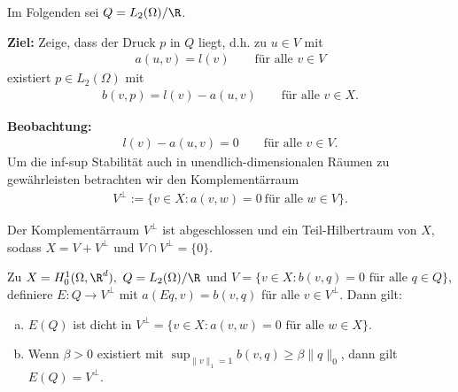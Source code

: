 Im Folgenden sei $Q = L_2(\Omega)/\R$.

\textbf{Ziel:}
Zeige, dass der Druck $p$ in $Q$ liegt, d.h. zu $u\in V$ mit
\begin{eqnarray*}
    a(u, v) = l(v) \qquad \text{für alle } v\in V
\end{eqnarray*}
existiert $p\in L_2(\Omega)$ mit
\begin{eqnarray*}
    b(v, p) = l(v) - a(u, v) \qquad \text{für alle } v\in X.
\end{eqnarray*}

\textbf{Beobachtung:}
\begin{eqnarray*}
    l(v) - a(u, v) = 0 \qquad \text{für alle } v\in V.
\end{eqnarray*}
Um die inf-sup Stabilität auch in unendlich-dimensionalen Räumen zu
gewährleisten  betrachten wir den Komplementärraum
\begin{eqnarray*}
    V^\bot := \{v\in X: a(v, w) = 0 \ \text{für alle } w\in V\}.
\end{eqnarray*}


\begin{Bemerkung}
    Der Komplementärraum $V^\bot$ ist abgeschlossen und ein Teil-Hilbertraum
    von $X$, sodass $X = V + V^\bot$ und $V \cap V^\bot = \{0\}$.
\end{Bemerkung}


\begin{Satz}
    \label{satz:5.10}
    Zu $X = H_0^1(\Omega, \R^d), \ Q = L_2(\Omega) / \R$ und
    $V = \{v\in X: b(v, q) = 0 \text{ für alle } q\in Q\}$,
    definiere $E: Q \to V^\bot$ mit $a(Eq, v) = b(v, q)$ für alle
    $v\in V^\bot$.
    Dann gilt:
    \begin{enumerate}[a)]
      \item
        $E(Q)$ ist dicht in $V^\bot = \{v\in X: a(v, w) = 0 \text{ für alle }
        w\in X\}$.
      \item
        Wenn $\beta > 0$ existiert mit
        $\sup_{\|v\|_1 = 1} b(v, q) \ge \beta \|q\|_0$,
        dann gilt $E(Q) = V^\bot$.
    \end{enumerate}
\end{Satz}


